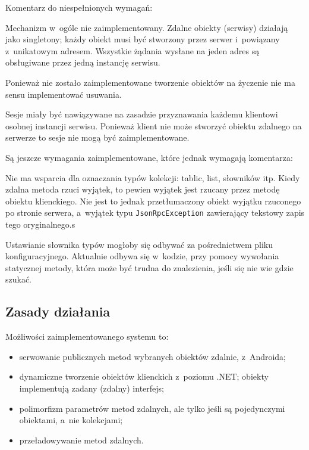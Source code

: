 Komentarz do niespełnionych wymagań:
\begin{description}
Mechanizm w~ogóle nie zaimplementowany. Zdalne obiekty (serwisy) działają jako singletony; każdy obiekt musi być stworzony przez serwer i~powiązany z~unikatowym adresem. Wszystkie żądania wysłane na jeden adres są obsługiwane przez jedną instancję serwisu.

Ponieważ nie zostało zaimplementowane tworzenie obiektów na życzenie nie ma sensu implementować usuwania.

Sesje miały być nawiązywane na zasadzie przyznawania każdemu klientowi osobnej instancji serwisu. Ponieważ klient nie może stworzyć obiektu zdalnego na serwerze to sesje nie mogą być zaimplementowane.
\end{description}

Są jeszcze wymagania zaimplementowane, które jednak wymagają komentarza:
\begin{description}
Nie ma wsparcia dla oznaczania typów kolekcji: tablic, list, słowników itp.
Kiedy zdalna metoda rzuci wyjątek, to pewien wyjątek jest rzucany przez metodę obiektu klienckiego. Nie jest to jednak przetłumaczony obiekt wyjątku rzuconego po stronie serwera, a~wyjątek typu \texttt{JsonRpcException} zawierający tekstowy zapis tego oryginalnego.s

Ustawianie słownika typów mogłoby się odbywać za pośrednictwem pliku konfiguracyjnego. Aktualnie odbywa się w~kodzie, przy pomocy wywołania statycznej metody, która może być trudna do znalezienia, jeśli się nie wie gdzie szukać.
\end{description}


\subsection{Zasady działania}
Możliwości zaimplementowanego systemu to:
\begin{itemize}
	\item serwowanie publicznych metod wybranych obiektów zdalnie, z~Androida;
	\item dynamiczne tworzenie obiektów klienckich z~poziomu .NET; obiekty implementują zadany (zdalny) interfejs;
	\item polimorfizm parametrów metod zdalnych, ale tylko jeśli są pojedynczymi obiektami, a~nie kolekcjami;
	\item przeładowywanie metod zdalnych.
\end{itemize}


